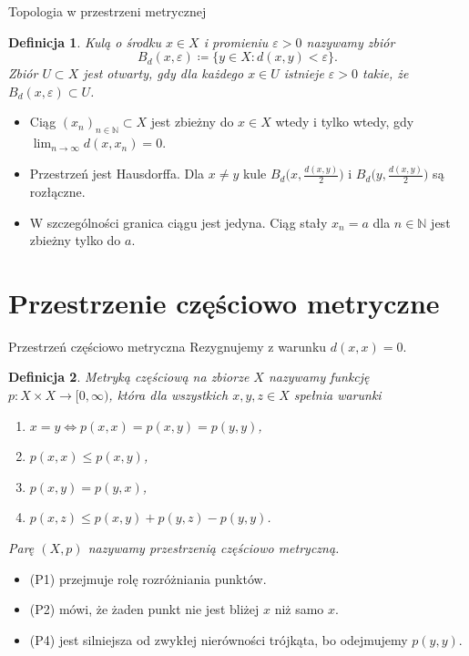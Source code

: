 \documentclass{beamer}
\newtheorem*{definicja}{Definicja}
\newcommand{\N}{\mathbb{N}}
\begin{document}
\begin{frame}{Topologia w przestrzeni metrycznej}
  \begin{definicja}
    \emph{Kulą} o środku $x\in X$ i promieniu $\varepsilon>0$ nazywamy zbiór
    \[
      B_d(x,\varepsilon)\coloneqq\{y\in X : d(x,y)<\varepsilon\}.
    \]
    Zbiór $U\subset X$ jest \emph{otwarty}, gdy dla każdego $x\in U$ istnieje
    $\varepsilon>0$ takie, że $B_d(x,\varepsilon)\subset U$.
  \end{definicja}

  \begin{itemize}
    \item Ciąg $(x_n)_{n\in\N}\subset X$ jest zbieżny do $x\in X$ wtedy i tylko
          wtedy, gdy $\lim_{n\to\infty}d(x,x_n)=0$.
    \item Przestrzeń jest Hausdorffa. Dla $x\neq y$ kule
          $B_d\bigl(x,\tfrac{d(x,y)}{2}\bigr)$ i $B_d\bigl(y,\tfrac{d(x,y)}{2}\bigr)$ są rozłączne.
    \item W szczególności granica ciągu jest jedyna. Ciąg stały $x_n=a$ dla
          $n\in\N$ jest zbieżny tylko do $a$.
  \end{itemize}
\end{frame}

\section{Przestrzenie częściowo metryczne}

\begin{frame}{Przestrzeń częściowo metryczna}
  Rezygnujemy z warunku $d(x,x)=0$.

  \begin{definicja}
    \emph{Metryką częściową} na zbiorze $X$ nazywamy funkcję
    $p\colon X\times X\to[0,\infty)$, która dla wszystkich $x,y,z\in X$ spełnia warunki
    \begin{enumerate}
      \item[(P1)] $x=y \iff p(x,x)=p(x,y)=p(y,y)$,
      \item[(P2)] $p(x,x)\le p(x,y)$,
      \item[(P3)] $p(x,y)=p(y,x)$,
      \item[(P4)] $p(x,z)\le p(x,y)+p(y,z)-p(y,y)$.
    \end{enumerate}
    Parę $(X,p)$ nazywamy \emph{przestrzenią częściowo metryczną}.
  \end{definicja}

  \begin{itemize}
    \item (P1) przejmuje rolę rozróżniania punktów.
    \item (P2) mówi, że żaden punkt nie jest bliżej $x$ niż samo $x$.
    \item (P4) jest silniejsza od zwykłej nierówności trójkąta, bo odejmujemy $p(y,y)$.
  \end{itemize}
\end{frame}
\end{document}
